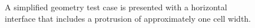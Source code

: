 \begin{figure}[htbp]
	\centering
	\begin{minipage}{0.3\textwidth}
		\caption{A simplified geometry test case is presented with a horizontal interface that includes a protrusion of approximately one cell width.}
		\label{fig:0}
	\end{minipage}%
\hfill
	\begin{minipage}{0.3\textwidth}

\end{minipage}
\end{figure}
